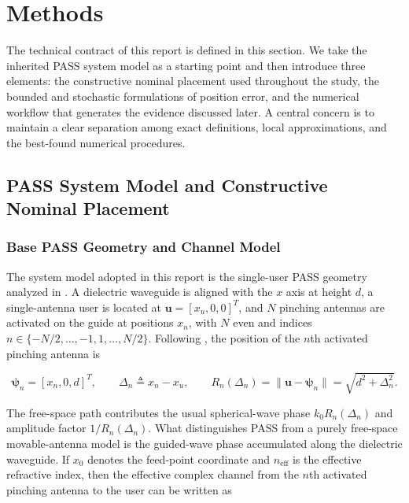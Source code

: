 \section{Methods}

The technical contract of this report is defined in this section. We take the inherited PASS system model as a starting point and then introduce three elements: the constructive nominal placement used throughout the study, the bounded and stochastic formulations of position error, and the numerical workflow that generates the evidence discussed later. A central concern is to maintain a clear separation among exact definitions, local approximations, and the best-found numerical procedures.

\subsection{PASS System Model and Constructive Nominal Placement}

\subsubsection{Base PASS Geometry and Channel Model}

The system model adopted in this report is the single-user PASS geometry analyzed in \cite{ouyang2025array}. A dielectric waveguide is aligned with the $x$ axis at height $d$, a single-antenna user is located at $\mathbf{u} = [x_u, 0, 0]^T$, and $N$ pinching antennas are activated on the guide at positions $x_n$, with $N$ even and indices $n \in \{-N/2, \ldots, -1, 1, \ldots, N/2\}$. Following \cite{ouyang2025array}, the position of the $n$th activated pinching antenna is

\begin{equation}
\bm{\psi}_n = [x_n, 0, d]^T, \qquad
\Delta_n \triangleq x_n - x_u, \qquad
R_n(\Delta_n) = \lVert \mathbf{u} - \bm{\psi}_n \rVert = \sqrt{d^2 + \Delta_n^2}.
\label{eq:geom}
\end{equation}

The free-space path contributes the usual spherical-wave phase $k_0 R_n(\Delta_n)$ and amplitude factor $1 / R_n(\Delta_n)$. What distinguishes PASS from a purely free-space movable-antenna model is the guided-wave phase accumulated along the dielectric waveguide. If $x_0$ denotes the feed-point coordinate and $n_{\mathrm{eff}}$ is the effective refractive index, then the effective complex channel from the $n$th activated pinching antenna to the user can be written as \cite{ouyang2025array}

